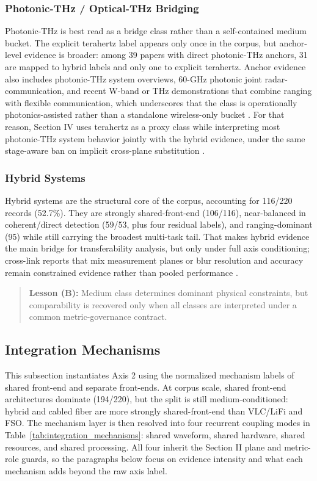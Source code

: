\documentclass[letterpaper,journal]{IEEEtran}
\begin{document}
\subsubsection{Photonic-THz / Optical-THz Bridging}
Photonic-THz is best read as a bridge class rather than a self-contained medium bucket. The explicit terahertz label appears only once in the corpus, but anchor-level evidence is broader: among 39 papers with direct photonic-THz anchors, 31 are mapped to hybrid labels and only one to explicit terahertz. Anchor evidence also includes photonic-THz system overviews, 60-GHz photonic joint radar-communication, and recent W-band or THz demonstrations that combine ranging with flexible communication, which underscores that the class is operationally photonics-assisted rather than a standalone wireless-only bucket \cite{O_ISAC_002,O_ISAC_057,O_ISAC_301,O_ISAC_356}. For that reason, Section IV uses terahertz as a proxy class while interpreting most photonic-THz system behavior jointly with the hybrid evidence, under the same stage-aware ban on implicit cross-plane substitution \cite{O_ISAC_016,O_ISAC_077,O_ISAC_105,O_ISAC_070,O_ISAC_029}.

\subsubsection{Hybrid Systems}
Hybrid systems are the structural core of the corpus, accounting for 116/220 records (52.7\%). They are strongly shared-front-end (106/116), near-balanced in coherent/direct detection (59/53, plus four residual labels), and ranging-dominant (95) while still carrying the broadest multi-task tail. That makes hybrid evidence the main bridge for transferability analysis, but only under full axis conditioning; cross-link reports that mix measurement planes or blur resolution and accuracy remain constrained evidence rather than pooled performance \cite{O_ISAC_021,O_ISAC_077,O_ISAC_041,O_ISAC_199,O_ISAC_010}.

\begin{quote}
    \textbf{Lesson (B):} Medium class determines dominant physical constraints, but comparability is recovered only when all classes are interpreted under a common metric-governance contract.
\end{quote}

\subsection{Integration Mechanisms}
This subsection instantiates Axis 2 using the normalized mechanism labels of shared front-end and separate front-ends. At corpus scale, shared front-end architectures dominate (194/220), but the split is still medium-conditioned: hybrid and cabled fiber are more strongly shared-front-end than VLC/LiFi and FSO. The mechanism layer is then resolved into four recurrent coupling modes in Table~\ref{tab:integration_mechanisms}: shared waveform, shared hardware, shared resources, and shared processing. All four inherit the Section II plane and metric-role guards, so the paragraphs below focus on evidence intensity and what each mechanism adds beyond the raw axis label.
\end{document}
